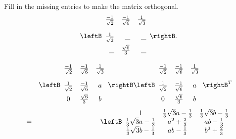 \begin{enumialphparenastyle}
\begin{ex} Fill in the missing entries to make the matrix orthogonal. 
\begin{equation*}
\leftB 
\begin{array}{rrr}
\vspace{0.05in}\frac{-1}{\sqrt{2}} & \vspace{0.05in}\frac{-1}{\sqrt{6}} & 
\vspace{0.05in}\frac{1}{\sqrt{3}} \\ 
\vspace{0.05in}\frac{1}{\sqrt{2}} & \_ & \_ \\ 
\_ & \vspace{0.05in}\frac{\sqrt{6}}{3} & \_
\end{array}
\rightB .
\end{equation*}
\begin{sol}
\begin{eqnarray*}
&&\leftB
\begin{array}{ccc}
\vspace{0.05in}\frac{-1}{\sqrt{2}} & \vspace{0.05in}\frac{-1}{\sqrt{6}} &
\vspace{0.05in}\frac{1}{\sqrt{3}} \\
\vspace{0.05in}\frac{1}{\sqrt{2}} & \frac{-1}{\sqrt{6}} & a \\
0 & \vspace{0.05in}\frac{\sqrt{6}}{3} & b
\end{array}
\rightB \leftB
\begin{array}{ccc}
\vspace{0.05in}\frac{-1}{\sqrt{2}} & \vspace{0.05in}\frac{-1}{\sqrt{6}} &
\vspace{0.05in}\frac{1}{\sqrt{3}} \\
\vspace{0.05in}\frac{1}{\sqrt{2}} & \frac{-1}{\sqrt{6}} & a \\
0 & \vspace{0.05in}\frac{\sqrt{6}}{3} & b
\end{array}
\rightB ^{T} \\
&=& \leftB
\begin{array}{ccc}
1 & \frac{1}{3}\sqrt{3}a-\frac{1}{3} & \frac{1}{3}\sqrt{3}b-\frac{1}{3} \\
\frac{1}{3}\sqrt{3}a-\frac{1}{3} & a^{2}+\frac{2}{3} & ab-\frac{1}{3} \\
\frac{1}{3}\sqrt{3}b-\frac{1}{3} & ab-\frac{1}{3} & b^{2}+\frac{2}{3}

\end{array}
\end{eqnarray*}
\end{sol}
\end{ex}
\end{enumialphparenastyle}
